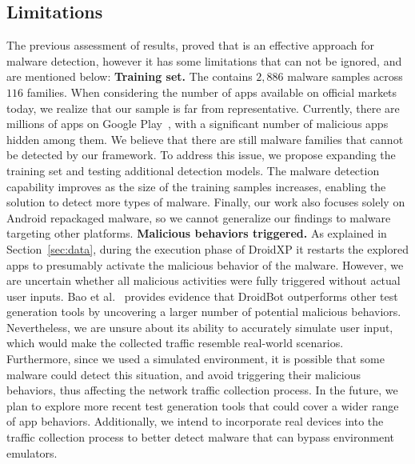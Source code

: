 \subsection{Limitations}\label{sec:limitations}

The previous assessment of results, proved that \droidxpflow is an effective approach for malware detection, however it has some limitations that can not be ignored, and are mentioned below:\newline
\textbf{Training set.} The \fds contains $2,886$ malware samples across $116$ families. When considering the number of apps available on official markets today, we realize that our sample is far from representative. Currently, there are millions of apps on Google Play~\cite{bankmycell}, with a significant number of malicious apps hidden among them. We believe that there are still malware families that cannot be detected by our framework. To address this issue, we propose expanding the training set and testing additional detection models. The malware detection capability improves as the size of the training samples increases, enabling the solution to detect more types of malware. Finally, our work also focuses solely on Android repackaged malware, so we cannot generalize our findings to malware targeting other platforms.\newline
\textbf{Malicious behaviors triggered.} As explained in Section~\ref{sec:data}, during the execution phase of DroidXP it restarts the explored apps to presumably activate the malicious behavior of the malware. However, we are uncertain whether all malicious activities were fully triggered without actual user inputs. Bao et al.~\cite{DBLP:conf/wcre/BaoLL18} provides evidence that DroidBot outperforms other test generation tools by uncovering a larger number of potential malicious behaviors. Nevertheless, we are unsure about its ability to accurately simulate user input, which would make the collected traffic resemble real-world scenarios. Furthermore, since we used a simulated environment, it is possible that some malware could detect this situation, and avoid triggering their malicious behaviors, thus affecting the network traffic collection process. In the future, we plan to explore more recent test generation tools that could cover a wider range of app behaviors. Additionally, we intend to incorporate real devices into the traffic collection process to better detect malware that can bypass environment emulators.